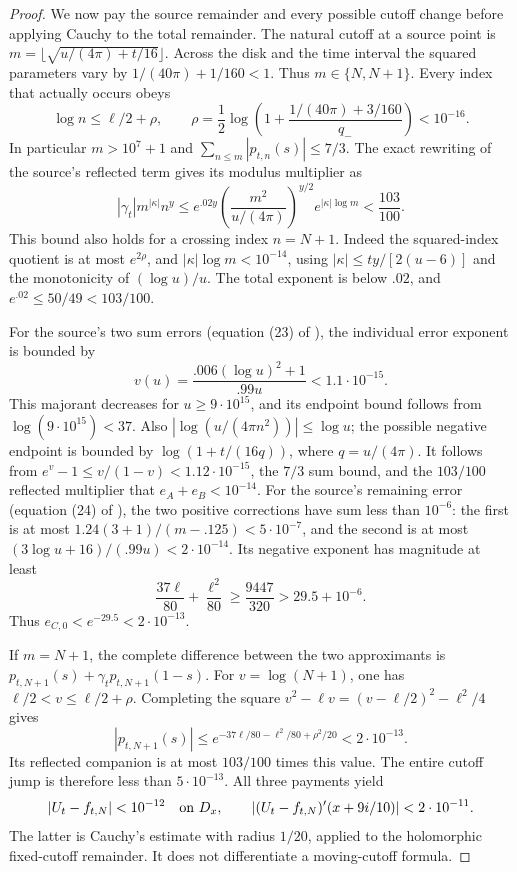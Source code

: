 \documentclass[11pt]{article}
\numberwithin{equation}{section}
\theoremstyle{definition}
\theoremstyle{remark}
\begin{document}
\begin{proof}
We now pay the source remainder and every possible cutoff change before
applying Cauchy to the total remainder.  The natural cutoff at a source
point is
\(m=\lfloor\sqrt{u/(4\pi)+t/16}\rfloor\).
Across the disk and the time interval the squared parameters vary by
\(1/(40\pi)+1/160<1\).  Thus \(m\in\{N,N+1\}\).
Every index that actually occurs obeys
\[
 \log n\le\ell/2+\rho,\qquad
 \rho=\frac12\log\left(1+
            \frac{1/(40\pi)+3/160}{q_-}\right)<10^{-16}.
\]
In particular \(m>10^7+1\) and
\(\sum_{n\le m}|p_{t,n}(s)|\le7/3\).
The exact rewriting of the source's reflected term gives its modulus
multiplier as
\[
 |\gamma_t|m^{|\kappa|}n^y
 \le e^{.02y}
      \left(\frac{m^2}{u/(4\pi)}\right)^{y/2}
      e^{|\kappa|\log m}<\frac{103}{100}.
\]
This bound also holds for a crossing index \(n=N+1\).
Indeed the squared-index quotient is at most \(e^{2\rho}\), and
\(|\kappa|\log m<10^{-14}\), using
\(|\kappa|\le ty/[2(u-6)]\) and the monotonicity of \((\log u)/u\).
The total exponent is below \(.02\), and
\(e^{.02}\le50/49<103/100\).

For the source's two sum errors (equation (23) of \cite{polymath}),
the individual error exponent is bounded by
\[
 v(u)=\frac{.006(\log u)^2+1}{.99u}<1.1\cdot10^{-15}.
\]
This majorant decreases for \(u\ge9\cdot10^{15}\), and its endpoint
bound follows from \(\log(9\cdot10^{15})<37\).
Also \(|\log(u/(4\pi n^2))|\le\log u\); the possible negative
endpoint is bounded by \(\log(1+t/(16q))\), where \(q=u/(4\pi)\).
It follows from \(e^v-1\le v/(1-v)<1.12\cdot10^{-15}\), the
\(7/3\) sum bound, and the \(103/100\) reflected multiplier that
\(e_A+e_B<10^{-14}\).
For the source's remaining error (equation (24) of \cite{polymath}),
the two positive corrections have sum less than \(10^{-6}\): the first
is at most \(1.24(3+1)/(m-.125)<5\cdot10^{-7}\), and the second is at
most \((3\log u+16)/(.99u)<2\cdot10^{-14}\).
Its negative exponent has magnitude at least
\[
 \frac{37\ell}{80}+\frac{\ell^2}{80}
 \ge\frac{9447}{320}>29.5+10^{-6}.
\]
Thus \(e_{C,0}<e^{-29.5}<2\cdot10^{-13}\).

If \(m=N+1\), the complete difference between the two approximants is
\(p_{t,N+1}(s)+\gamma_t p_{t,N+1}(1-s)\).
For \(v=\log(N+1)\), one has \(\ell/2<v\le\ell/2+\rho\).
Completing the square \(v^2-\ell v=(v-\ell/2)^2-\ell^2/4\) gives
\[
 |p_{t,N+1}(s)|\le
 e^{-37\ell/80-\ell^2/80+\rho^2/20}
 <2\cdot10^{-13}.
\]
Its reflected companion is at most \(103/100\) times this value.
The entire cutoff jump is therefore less than \(5\cdot10^{-13}\).
All three payments yield
\[
 |U_t-f_{t,N}|<10^{-12}\quad\hbox{on }D_x,
 \qquad |(U_t-f_{t,N})'(x+9i/10)|<2\cdot10^{-11}.
\]
The latter is Cauchy's estimate with radius \(1/20\), applied to the
holomorphic fixed-cutoff remainder.  It does not differentiate a
moving-cutoff formula.


\end{proof}
\end{document}
